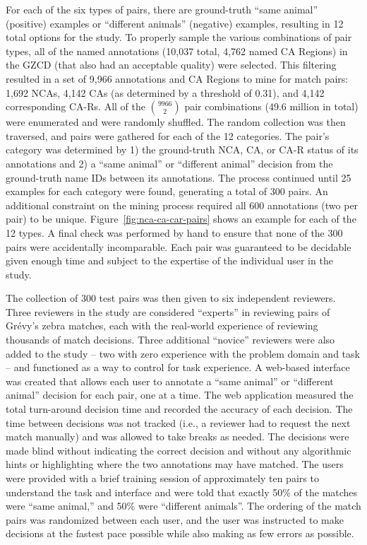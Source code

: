For each of the six types of pairs, there are ground-truth ``same animal'' (positive) examples or ``different animals'' (negative) examples, resulting in 12 total options for the study.  To properly sample the various combinations of pair types, all of the named annotations (10,037 total, 4,762 named CA Regions) in the GZCD (that also had an acceptable quality) were selected.  This filtering resulted in a set of 9,966 annotations and CA Regions to mine for match pairs: 1,692 NCAs, 4,142 CAs (as determined by a threshold of 0.31), and 4,142 corresponding CA-Rs.  All of the ${9966 \choose 2}$ pair combinations (49.6 million in total) were enumerated and were randomly shuffled.  The random collection was then traversed, and pairs were gathered for each of the 12 categories.  The pair's category was determined by 1) the ground-truth NCA, CA, or CA-R status of its annotations and 2) a ``same animal'' or ``different animal'' decision from the ground-truth name IDs between its annotations.  The process continued until 25 examples for each category were found, generating a total of 300 pairs.  An additional constraint on the mining process required all 600 annotations (two per pair) to be unique.  Figure~\ref{fig:nca-ca-car-pairs} shows an example for each of the 12 types.  A final check was performed by hand to ensure that none of the 300 pairs were accidentally incomparable. Each pair was guaranteed to be decidable given enough time and subject to the expertise of the individual user in the study.

The collection of 300 test pairs was then given to six independent reviewers.  Three reviewers in the study are considered ``experts'' in reviewing pairs of Gr\'evy's zebra matches, each with the real-world experience of reviewing thousands of match decisions.  Three additional ``novice'' reviewers were also added to the study -- two with zero experience with the problem domain and task -- and functioned as a way to control for task experience.  A web-based interface was created that allows each user to annotate a ``same animal'' or ``different animal'' decision for each pair, one at a time.  The web application measured the total turn-around decision time and recorded the accuracy of each decision.  The time between decisions was not tracked (i.e., a reviewer had to request the next match manually) and was allowed to take breaks as needed.  The decisions were made blind without indicating the correct decision and without any algorithmic hints or highlighting where the two annotations may have matched.  The users were provided with a brief training session of approximately ten pairs to understand the task and interface and were told that exactly 50\% of the matches were ``same animal,'' and 50\% were ``different animals''.  The ordering of the match pairs was randomized between each user, and the user was instructed to make decisions at the fastest pace possible while also making as few errors as possible.

